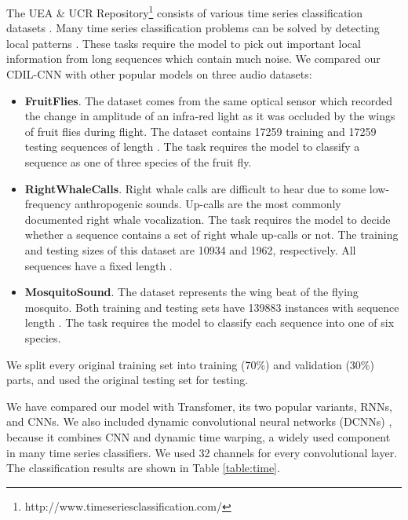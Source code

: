 \documentclass{article}
\begin{document}
The UEA \& UCR Repository\footnote{http://www.timeseriesclassification.com/} consists of various time series classification datasets \cite{dau2019ucr}. Many time series classification problems can be solved by detecting local patterns \cite{geurts2001pattern, ye2009time, iwana2020time}. These tasks require the model to pick out important local information from long sequences which contain much noise. We compared our CDIL-CNN with other popular models on three audio datasets:
\begin{itemize}
    \item \textbf{FruitFlies}. The dataset comes from the same optical sensor which recorded the change in amplitude of an infra-red light as it was occluded by the wings of fruit flies during flight. The dataset contains 17259 training and 17259 testing sequences of length . The task requires the model to classify a sequence as one of three species of the fruit fly.
    
    \item \textbf{RightWhaleCalls}. Right whale calls are difficult to hear due to some low-frequency anthropogenic sounds. Up-calls are the most commonly documented right whale vocalization. The task requires the model to decide whether a sequence contains a set of right whale up-calls or not. The training and testing sizes of this dataset are 10934 and 1962, respectively. All sequences have a fixed length .
    
    \item \textbf{MosquitoSound}. The dataset represents the wing beat of the flying mosquito. Both training and testing sets have 139883 instances with sequence length . The task requires the model to classify each sequence into one of six species.
\end{itemize}
We split every original training set into training (70\%) and validation (30\%) parts, and used the original testing set for testing.

We have compared our model with Transfomer, its two popular variants, RNNs, and CNNs. We also included dynamic convolutional neural networks (DCNNs) \cite{10.1145/3227609.3227690, 10.1007/978-3-030-88113-9_24}, because it combines CNN and dynamic time warping, a widely used component in many time series classifiers. We used 32 channels for every convolutional layer. The classification results are shown in Table \ref{table:time}.
\end{document}
